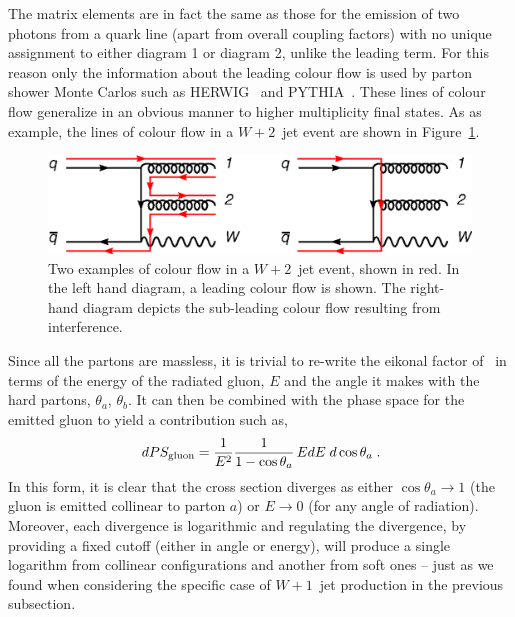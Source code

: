 \documentclass[12pt]{iopart}
\begin{document}
The matrix elements are in fact the same as those for the emission of two photons from a quark
line (apart from overall coupling factors) with no unique assignment to either diagram 1 or
diagram 2, unlike the leading term. For this reason only the information about the
leading colour flow is used by parton shower Monte Carlos such as HERWIG~\cite{Corcella:2000bw}
and PYTHIA~\cite{Sjostrand:2006za}. These lines of colour flow generalize in an obvious manner to
higher multiplicity final states. As as example, the lines of colour flow in a $W+2$~jet event are
shown in Figure~\ref{fig:colflow}.
%
\begin{figure}[t]
\begin{center}
\includegraphics[width=12cm]{colflow.eps}
\end{center}
\caption{Two examples of colour flow in a $W+2$~jet event, shown in red. In the left hand diagram, a
leading colour flow is shown. The right-hand diagram depicts the sub-leading colour flow
resulting from interference. \label{fig:colflow}}
\end{figure}
%

Since all the partons are massless, it is trivial to re-write the eikonal factor of~
in terms of the energy of the radiated gluon, $E$ and the
angle it makes with the hard partons, $\theta_a$, $\theta_b$. It can then be
combined with the phase space for the emitted gluon to yield a contribution such as,
\begin{equation}
[a~b] \, dPS_{\rm gluon} =
 \frac{1}{E^2} \frac{1}{1-\cos\theta_a}
 \, E dE \; d\cos\theta_a \; .
\end{equation}
In this form, it is clear that the cross section diverges as either
$\cos\theta_a \to 1$ (the gluon is emitted collinear to parton $a$) or
$E \to 0$ (for any angle of radiation). Moreover, each divergence is logarithmic
and regulating the divergence, by providing a fixed cutoff (either in angle or energy),
will produce a single logarithm from
collinear configurations and another from soft ones -- just as we found when considering the
specific case of $W+1$~jet production in the previous subsection.
\end{document}
